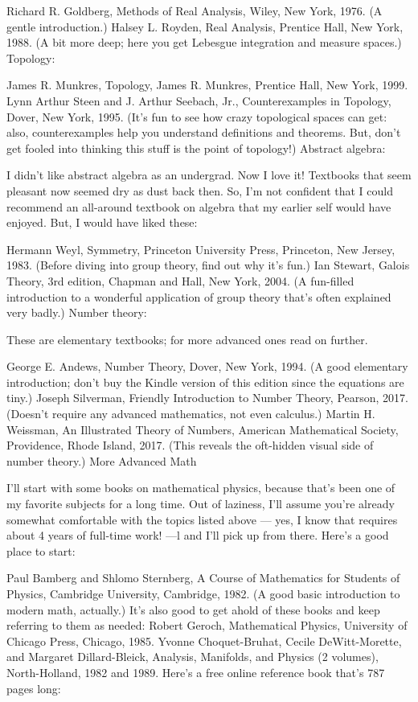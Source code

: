 \documentclass[10pt,a4paper]{book}
\theoremstyle{definition}
\begin{document}
Richard R. Goldberg, Methods of Real Analysis, Wiley, New York, 1976. (A gentle introduction.)
Halsey L. Royden, Real Analysis, Prentice Hall, New York, 1988. (A bit more deep; here you get Lebesgue integration and measure spaces.)
Topology:

James R. Munkres, Topology, James R. Munkres, Prentice Hall, New York, 1999.
Lynn Arthur Steen and J. Arthur Seebach, Jr., Counterexamples in Topology, Dover, New York, 1995. (It's fun to see how crazy topological spaces can get: also, counterexamples help you understand definitions and theorems. But, don't get fooled into thinking this stuff is the point of topology!)
Abstract algebra:

I didn't like abstract algebra as an undergrad. Now I love it! Textbooks that seem pleasant now seemed dry as dust back then. So, I'm not confident that I could recommend an all-around textbook on algebra that my earlier self would have enjoyed. But, I would have liked these:

Hermann Weyl, Symmetry, Princeton University Press, Princeton, New Jersey, 1983. (Before diving into group theory, find out why it's fun.)
Ian Stewart, Galois Theory, 3rd edition, Chapman and Hall, New York, 2004. (A fun-filled introduction to a wonderful application of group theory that's often explained very badly.)
Number theory:

These are elementary textbooks; for more advanced ones read on further.

George E. Andews, Number Theory, Dover, New York, 1994. (A good elementary introduction; don't buy the Kindle version of this edition since the equations are tiny.)
Joseph Silverman, Friendly Introduction to Number Theory, Pearson, 2017. (Doesn't require any advanced mathematics, not even calculus.)
Martin H. Weissman, An Illustrated Theory of Numbers, American Mathematical Society, Providence, Rhode Island, 2017. (This reveals the oft-hidden visual side of number theory.)
More Advanced Math

I'll start with some books on mathematical physics, because that's been one of my favorite subjects for a long time. Out of laziness, I'll assume you're already somewhat comfortable with the topics listed above — yes, I know that requires about 4 years of full-time work! —l and I'll pick up from there. Here's a good place to start:

Paul Bamberg and Shlomo Sternberg, A Course of Mathematics for Students of Physics, Cambridge University, Cambridge, 1982. (A good basic introduction to modern math, actually.)
It's also good to get ahold of these books and keep referring to them as needed:
Robert Geroch, Mathematical Physics, University of Chicago Press, Chicago, 1985.
Yvonne Choquet-Bruhat, Cecile DeWitt-Morette, and Margaret Dillard-Bleick, Analysis, Manifolds, and Physics (2 volumes), North-Holland, 1982 and 1989.
Here's a free online reference book that's 787 pages long:
\end{document}

